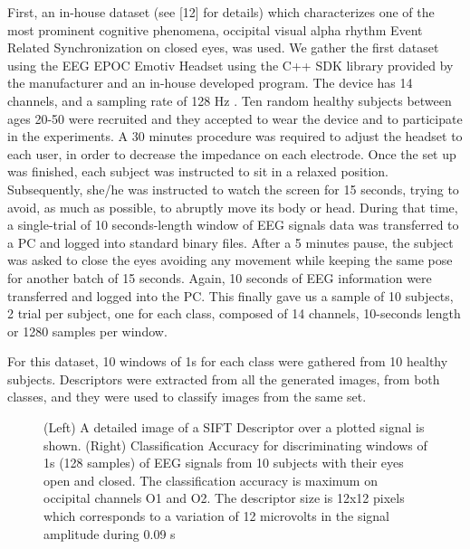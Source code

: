 First, an in-house dataset (see [12] for details) which characterizes one of the most prominent cognitive phenomena, occipital visual alpha rhythm Event Related Synchronization on closed eyes, was used.  We gather the first dataset using the EEG EPOC Emotiv Headset using the C++ SDK library provided by the manufacturer and an in-house developed program. The device has 14 channels, and a sampling rate of 128 Hz \cite{c11}. Ten random healthy subjects between ages 20-50 were recruited and they accepted to wear the device and to participate in the experiments.  A 30 minutes procedure was required to adjust the headset to each user, in order to decrease the impedance on each electrode. Once the set up was finished, each subject was instructed to sit in a relaxed position. Subsequently, she/he was instructed to watch the screen for 15 seconds, trying to avoid, as much as possible, to abruptly move its body or head.  During that time, a single-trial of 10 seconds-length window of EEG signals data was transferred to a PC and logged into standard binary files. After a 5 minutes pause, the subject was asked to close the eyes avoiding any movement while keeping the same pose for another batch of 15 seconds.  Again, 10 seconds of EEG information were transferred and logged into the PC. This finally gave us a sample of 10 subjects,  2 trial per subject, one for each class, composed of 14 channels, 10-seconds length or 1280 samples per window. 

For this dataset, 10 windows of 1s for each class were gathered from 10 healthy subjects.  Descriptors were extracted from all the generated images, from both classes, and they were used to classify images from the same set.     
   
  \begin{figure}[thpb]
      \centering
      \setlength\fboxsep{0pt}
	  \setlength\fboxrule{0.5pt}
      \caption{(Left) A detailed image of a SIFT Descriptor over a plotted signal is shown.  (Right) Classification Accuracy for discriminating windows of 1s (128 samples) of EEG signals from 10 subjects with their eyes open and closed.  The classification accuracy is maximum on occipital channels O1 and O2. The descriptor size is 12x12 pixels which corresponds to a variation of 12 microvolts in the signal amplitude during 0.09 s}
      \label{figure1}
   \end{figure}
   
